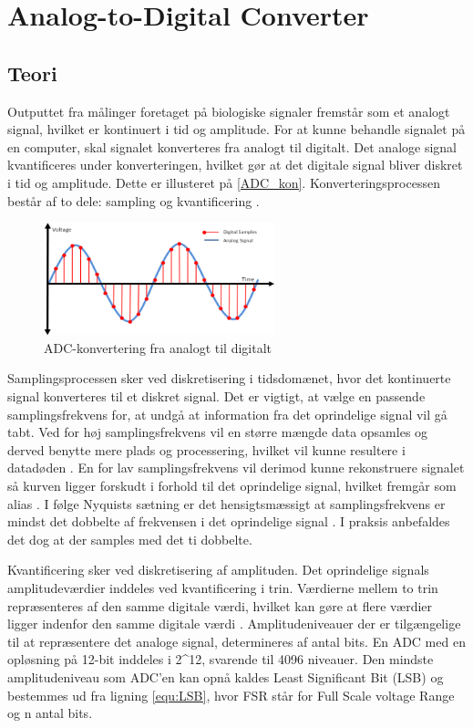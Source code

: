 \section{Analog-to-Digital Converter}
\subsection{Teori}
Outputtet fra målinger foretaget på biologiske signaler fremstår som et analogt signal, hvilket er kontinuert i tid og amplitude. For at kunne behandle signalet på en computer, skal signalet konverteres fra analogt til digitalt. Det analoge signal kvantificeres under konverteringen, hvilket gør at det digitale signal bliver diskret i tid og amplitude. \citep{adc1998} Dette er illusteret på \autoref{ADC_kon}. Konverteringsprocessen består af to dele: sampling og kvantificering \citep{adc2003}. 

\begin{figure}[H]
\centering
\includegraphics[width=0.6\textwidth]{figures/problemloesning/adc.png}
\caption{ADC-konvertering fra analogt til digitalt}
\label{fig:ADC_kon}
\end{figure}

Samplingsprocessen sker ved diskretisering i tidsdomænet, hvor det kontinuerte signal konverteres til et diskret signal. Det er vigtigt, at vælge en passende samplingsfrekvens for, at undgå at information fra det oprindelige signal vil gå tabt.\citep{adc2003} Ved for høj samplingsfrekvens vil en større mængde data opsamles og derved benytte mere plads og processering, hvilket vil kunne resultere i datadøden \citep{adc2004}. En for lav samplingsfrekvens vil  derimod kunne rekonstruere signalet så kurven ligger forskudt i forhold til det oprindelige signal, hvilket fremgår som alias \citep{adc2003}. I følge Nyquists sætning er det hensigtsmæssigt at samplingsfrekvens er mindst det dobbelte af frekvensen i det oprindelige signal \citep{adc2003}. I praksis anbefaldes det dog at der samples med det ti dobbelte.

Kvantificering sker ved diskretisering af amplituden. Det oprindelige signals amplitudeværdier inddeles ved kvantificering i trin. Værdierne mellem to trin repræsenteres af den samme digitale værdi, hvilket kan gøre at flere værdier ligger indenfor den samme digitale værdi \citep{adc2003}. Amplitudeniveauer der er tilgængelige til at repræsentere det analoge signal, determineres af antal bits. En ADC med en opløsning på 12-bit inddeles i {2}^{12}, svarende til 4096 niveauer. Den mindste amplitudeniveau som ADC'en kan opnå kaldes Least Significant Bit (LSB) og bestemmes ud fra ligning \autoref{equ:LSB}, hvor FSR står for Full Scale voltage Range og n antal bits. \citep{adc1998, adc2004}

